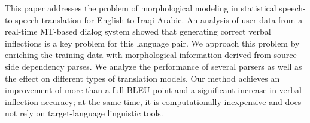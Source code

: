 This paper addresses the problem of morphological modeling in statistical speech-to-speech translation for English to Iraqi Arabic. An analysis of user data from a real-time MT-based dialog system showed that generating correct verbal inflections is a key problem for this language pair. We approach this problem by enriching the training data with morphological information derived from source-side dependency parses. We analyze the performance of several parsers as well as the effect on different types of translation models.  Our method achieves an improvement of more than a full BLEU point and a significant increase in verbal inflection accuracy; at the same time, it is computationally inexpensive and does not rely on target-language linguistic tools.
